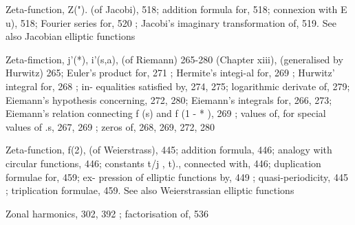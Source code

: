 Zeta-function, Z("). (of Jacobi), 518; addition formula for, 518; connexion with E u), 518;
Fourier series for, 520 ; Jacobi's imaginary transformation of, 519. See also Jacobian
elliptic functions

Zeta-fimction, j'(*), i'(s,a), (of Riemann) 265-280 (Chapter xiii), (generalised by Hurwitz) 265;
Euler's product for, 271 ; Hermite's integi-al for, 269 ; Hurwitz' integral for, 268 ; in-
equalities satisfied by, 274, 275; logarithmic derivate of, 279; Eiemann's hypothesis
concerning, 272, 280; Eiemann's integrals for, 266, 273; Eiemann's relation connecting f (s)
and f (1 - * ), 269 ; values of, for special values of .s, 267, 269 ; zeros of, 268, 269, 272, 280

Zeta-function, f(2), (of Weierstrass), 445; addition formula, 446; analogy with circular
functions, 446; constants t/j , t)., connected with, 446; duplication formulae for, 459; ex-
pression of elliptic functions by, 449 ; quasi-periodicity, 445 ; triplication formulae, 459.
See also Weierstrassian elliptic functions

Zonal harmonics, 302, 392 ; factorisation of, 536